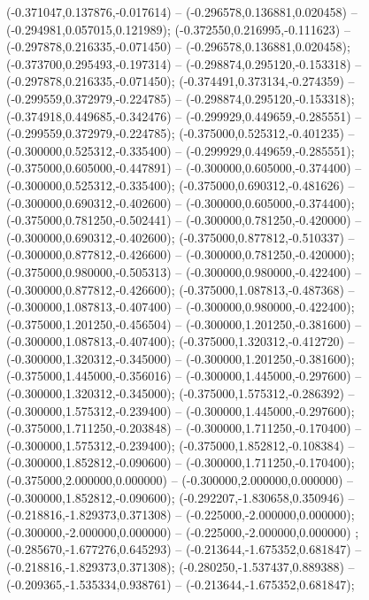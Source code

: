  (-0.371047,0.137876,-0.017614) -- (-0.296578,0.136881,0.020458) -- (-0.294981,0.057015,0.121989);
 (-0.372550,0.216995,-0.111623) -- (-0.297878,0.216335,-0.071450) -- (-0.296578,0.136881,0.020458);
 (-0.373700,0.295493,-0.197314) -- (-0.298874,0.295120,-0.153318) -- (-0.297878,0.216335,-0.071450);
 (-0.374491,0.373134,-0.274359) -- (-0.299559,0.372979,-0.224785) -- (-0.298874,0.295120,-0.153318);
 (-0.374918,0.449685,-0.342476) -- (-0.299929,0.449659,-0.285551) -- (-0.299559,0.372979,-0.224785);
 (-0.375000,0.525312,-0.401235) -- (-0.300000,0.525312,-0.335400) -- (-0.299929,0.449659,-0.285551);
 (-0.375000,0.605000,-0.447891) -- (-0.300000,0.605000,-0.374400) -- (-0.300000,0.525312,-0.335400);
 (-0.375000,0.690312,-0.481626) -- (-0.300000,0.690312,-0.402600) -- (-0.300000,0.605000,-0.374400);
 (-0.375000,0.781250,-0.502441) -- (-0.300000,0.781250,-0.420000) -- (-0.300000,0.690312,-0.402600);
 (-0.375000,0.877812,-0.510337) -- (-0.300000,0.877812,-0.426600) -- (-0.300000,0.781250,-0.420000);
 (-0.375000,0.980000,-0.505313) -- (-0.300000,0.980000,-0.422400) -- (-0.300000,0.877812,-0.426600);
 (-0.375000,1.087813,-0.487368) -- (-0.300000,1.087813,-0.407400) -- (-0.300000,0.980000,-0.422400);
 (-0.375000,1.201250,-0.456504) -- (-0.300000,1.201250,-0.381600) -- (-0.300000,1.087813,-0.407400);
 (-0.375000,1.320312,-0.412720) -- (-0.300000,1.320312,-0.345000) -- (-0.300000,1.201250,-0.381600);
 (-0.375000,1.445000,-0.356016) -- (-0.300000,1.445000,-0.297600) -- (-0.300000,1.320312,-0.345000);
 (-0.375000,1.575312,-0.286392) -- (-0.300000,1.575312,-0.239400) -- (-0.300000,1.445000,-0.297600);
 (-0.375000,1.711250,-0.203848) -- (-0.300000,1.711250,-0.170400) -- (-0.300000,1.575312,-0.239400);
 (-0.375000,1.852812,-0.108384) -- (-0.300000,1.852812,-0.090600) -- (-0.300000,1.711250,-0.170400);
 (-0.375000,2.000000,0.000000) -- (-0.300000,2.000000,0.000000) -- (-0.300000,1.852812,-0.090600);
 (-0.292207,-1.830658,0.350946) -- (-0.218816,-1.829373,0.371308) -- (-0.225000,-2.000000,0.000000);
 (-0.300000,-2.000000,0.000000) -- (-0.225000,-2.000000,0.000000) ;
 (-0.285670,-1.677276,0.645293) -- (-0.213644,-1.675352,0.681847) -- (-0.218816,-1.829373,0.371308);
 (-0.280250,-1.537437,0.889388) -- (-0.209365,-1.535334,0.938761) -- (-0.213644,-1.675352,0.681847);
